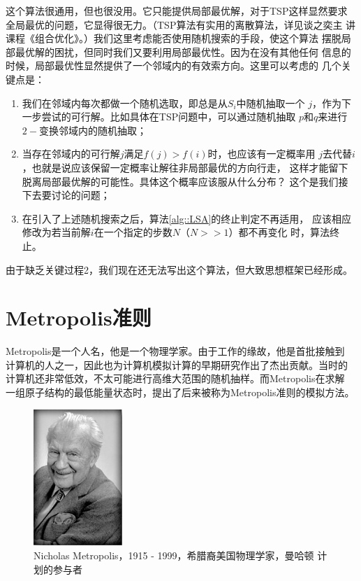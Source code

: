 这个算法很通用，但也很没用。它只能提供局部最优解，对于TSP这样显然要求
全局最优的问题，它显得很无力。（TSP算法有实用的离散算法，详见谈之奕主
  讲课程《组合优化》。）我们这里考虑能否使用随机搜索的手段，使这个算法
摆脱局部最优解的困扰，但同时我们又要利用局部最优性。因为在没有其他任何
信息的时候，局部最优性显然提供了一个邻域内的有效索方向。这里可以考虑的
几个关键点是：
\begin{enumerate}
  \item 我们在邻域内每次都做一个随机选取，即总是从$S_i$中随机抽取一个
    $j$，作为下一步尝试的可行解。比如具体在TSP问题中，可以通过随机抽取
    $p$和$q$来进行$2-$变换邻域内的随机抽取；
  \item 当存在邻域内的可行解$j$满足$f(j) > f(i)$时，也应该有一定概率用
    $j$去代替$i$，也就是说应该保留一定概率让解往非局部最优的方向行走，
    这样才能留下脱离局部最优解的可能性。具体这个概率应该服从什么分布？
    这个是我们接下去要讨论的问题；
  \item 在引入了上述随机搜索之后，算法\ref{alg::LSA}的终止判定不再适用，
    应该相应修改为若当前解$i$在一个指定的步数$N$（$N >> 1$）都不再变化
    时，算法终止。
\end{enumerate}

由于缺乏关键过程2，我们现在还无法写出这个算法，但大致思想框架已经形成。

\section{Metropolis准则}

Metropolis是一个人名，他是一个物理学家。由于工作的缘故，他是首批接触到
计算机的人之一，因此也为计算机模拟计算的早期研究作出了杰出贡献。当时的
计算机还非常低效，不太可能进行高维大范围的随机抽样。而Metropolis在求解
一组原子结构的最低能量状态时，提出了后来被称为Metropolis准则的模拟方法。

\begin{figure}[!ht]
\centering
\includegraphics[width=0.3\textwidth]{images/Nicholas.PNG}
\caption{Nicholas Metropolis，1915 - 1999，希腊裔美国物理学家，曼哈顿
  计划的参与者}
\label{fig::game}
\end{figure}

